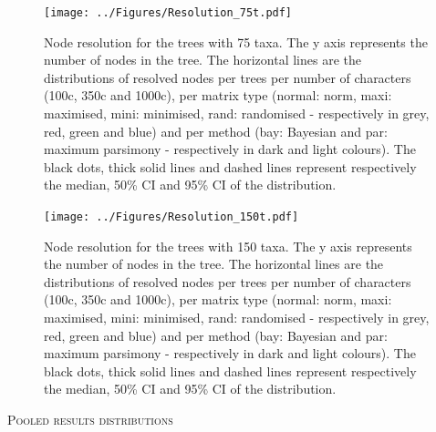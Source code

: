 \documentclass[12pt,letterpaper]{article}
\renewcommand{\section}[1]{%
\bigskip
\begin{center}
\begin{Large}
\normalfont\scshape #1
\medskip
\end{Large}
\end{center}}
\begin{document}
\begin{figure}[!htbp]
\centering
   \texttt{[image: ../Figures/Resolution\_75t.pdf]}
\caption{Node resolution for the trees with 75 taxa. The y axis represents the number of nodes in the tree. The horizontal lines are the distributions of resolved nodes per trees per number of characters (100c, 350c and 1000c), per matrix type (normal: norm, maxi: maximised, mini: minimised, rand: randomised - respectively in grey, red, green and blue) and per method (bay: Bayesian and par: maximum parsimony - respectively in dark and light colours). The black dots, thick solid lines and dashed lines represent respectively the median, 50\% CI and 95\% CI of the distribution.}
\label{Fig:Resolution_75t}
\end{figure}

\begin{figure}[!htbp]
\centering
   \texttt{[image: ../Figures/Resolution\_150t.pdf]}
\caption{Node resolution for the trees with 150 taxa. The y axis represents the number of nodes in the tree. The horizontal lines are the distributions of resolved nodes per trees per number of characters (100c, 350c and 1000c), per matrix type (normal: norm, maxi: maximised, mini: minimised, rand: randomised - respectively in grey, red, green and blue) and per method (bay: Bayesian and par: maximum parsimony - respectively in dark and light colours). The black dots, thick solid lines and dashed lines represent respectively the median, 50\% CI and 95\% CI of the distribution.}
\label{Fig:Resolution_150t}
\end{figure}







\newpage

\section{Pooled results distributions}



\newpage



\newpage



\newpage



\newpage
\end{document}
